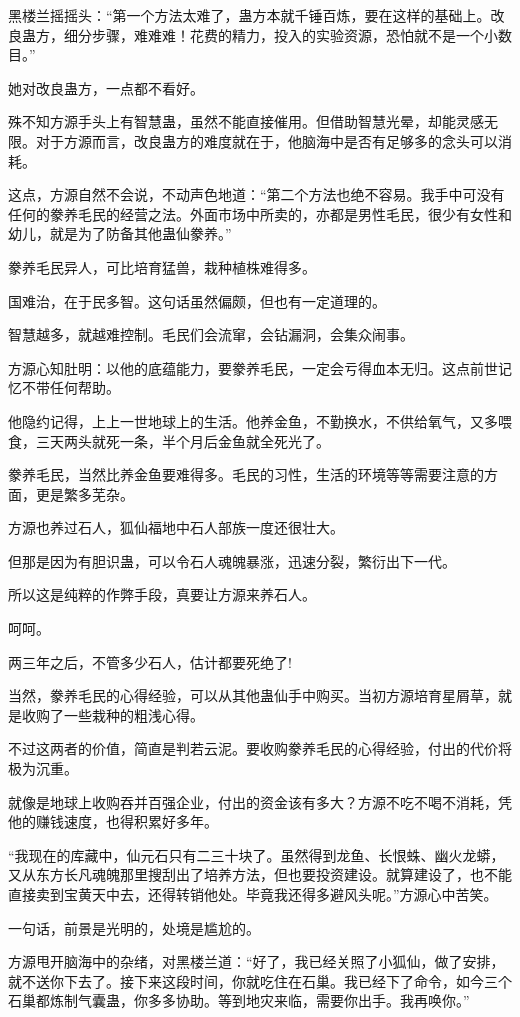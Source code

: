 \begin{this_body}
黑楼兰摇摇头：“第一个方法太难了，蛊方本就千锤百炼，要在这样的基础上。改良蛊方，细分步骤，难难难！花费的精力，投入的实验资源，恐怕就不是一个小数目。”

她对改良蛊方，一点都不看好。

殊不知方源手头上有智慧蛊，虽然不能直接催用。但借助智慧光晕，却能灵感无限。对于方源而言，改良蛊方的难度就在于，他脑海中是否有足够多的念头可以消耗。

这点，方源自然不会说，不动声色地道：“第二个方法也绝不容易。我手中可没有任何的豢养毛民的经营之法。外面市场中所卖的，亦都是男性毛民，很少有女性和幼儿，就是为了防备其他蛊仙豢养。”

豢养毛民异人，可比培育猛兽，栽种植株难得多。

国难治，在于民多智。这句话虽然偏颇，但也有一定道理的。

智慧越多，就越难控制。毛民们会流窜，会钻漏洞，会集众闹事。

方源心知肚明：以他的底蕴能力，要豢养毛民，一定会亏得血本无归。这点前世记忆不带任何帮助。

他隐约记得，上上一世地球上的生活。他养金鱼，不勤换水，不供给氧气，又多喂食，三天两头就死一条，半个月后金鱼就全死光了。

豢养毛民，当然比养金鱼要难得多。毛民的习性，生活的环境等等需要注意的方面，更是繁多芜杂。

方源也养过石人，狐仙福地中石人部族一度还很壮大。

但那是因为有胆识蛊，可以令石人魂魄暴涨，迅速分裂，繁衍出下一代。

所以这是纯粹的作弊手段，真要让方源来养石人。

呵呵。

两三年之后，不管多少石人，估计都要死绝了!

当然，豢养毛民的心得经验，可以从其他蛊仙手中购买。当初方源培育星屑草，就是收购了一些栽种的粗浅心得。

不过这两者的价值，简直是判若云泥。要收购豢养毛民的心得经验，付出的代价将极为沉重。

就像是地球上收购吞并百强企业，付出的资金该有多大？方源不吃不喝不消耗，凭他的赚钱速度，也得积累好多年。

“我现在的库藏中，仙元石只有二三十块了。虽然得到龙鱼、长恨蛛、幽火龙蟒，又从东方长凡魂魄那里搜刮出了培养方法，但也要投资建设。就算建设了，也不能直接卖到宝黄天中去，还得转销他处。毕竟我还得多避风头呢。”方源心中苦笑。

一句话，前景是光明的，处境是尴尬的。

方源甩开脑海中的杂绪，对黑楼兰道：“好了，我已经关照了小狐仙，做了安排，就不送你下去了。接下来这段时间，你就吃住在石巢。我已经下了命令，如今三个石巢都炼制气囊蛊，你多多协助。等到地灾来临，需要你出手。我再唤你。”


\end{this_body}

